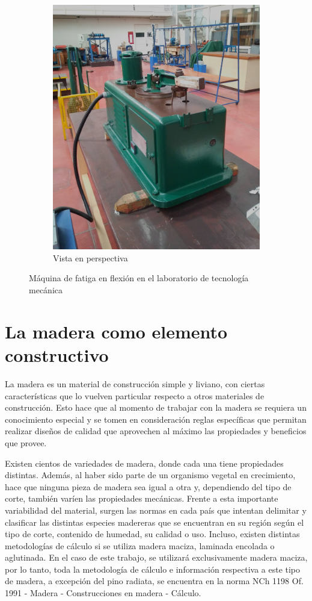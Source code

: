 \begin{figure}[h]
\begin{subfigure}{0.5\linewidth}
		\includegraphics[width=0.8\linewidth]{Imagenes/maq_iso.jpg}
		\caption{Vista en perspectiva}\label{fig:maq_iso}		
	\end{subfigure}
\caption{Máquina de fatiga en flexión en el laboratorio de tecnología mecánica}
\label{fig:maq_fat}
\end{figure}


\section{La madera como elemento constructivo}
La madera es un material de construcción simple y liviano, con ciertas características que lo vuelven particular respecto a otros materiales de construcción. Esto hace que al momento de trabajar con la madera se requiera un conocimiento especial y se tomen en consideración reglas específicas que permitan realizar diseños de calidad que aprovechen al máximo las propiedades y beneficios que provee.

Existen cientos de variedades de madera, donde cada una tiene propiedades distintas. Además, al haber sido parte de un organismo vegetal en crecimiento, hace que ninguna pieza de madera sea igual a otra y, dependiendo del tipo de corte, también varíen las propiedades mecánicas. Frente a esta importante variabilidad del material, surgen las normas en cada país que intentan delimitar y clasificar las distintas especies madereras que se encuentran en su región según el tipo de corte, contenido de humedad, su calidad o uso. Incluso, existen distintas metodologías de cálculo si se utiliza madera maciza, laminada encolada o aglutinada. En el caso de este trabajo, se utilizará exclusivamente madera maciza, por lo tanto, toda la metodología de cálculo e información respectiva a este tipo de madera, a excepción del pino radiata, se encuentra en la norma NCh 1198 Of. 1991 - Madera - Construcciones en madera - Cálculo.

